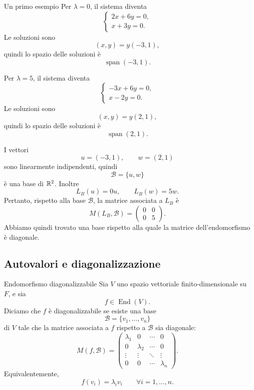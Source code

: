 \documentclass[a4paper]{article}
\begin{document}
\begin{snippetexample}{Un primo esempio}
    Per \(\lambda=0\), il sistema diventa
    \[
        \begin{cases}
            2x+6y=0,\\
            x+3y=0.
        \end{cases}
    \]
    Le soluzioni sono
    \[
        (x,y)=y(-3,1),
    \]
    quindi lo spazio delle soluzioni è
    \[
        \operatorname{span}(-3,1).
    \]

    Per \(\lambda=5\), il sistema diventa
    \[
        \begin{cases}
            -3x+6y=0,\\
            x-2y=0.
        \end{cases}
    \]
    Le soluzioni sono
    \[
        (x,y)=y(2,1),
    \]
    quindi lo spazio delle soluzioni è
    \[
        \operatorname{span}(2,1).
    \]

    I vettori
    \[
        u=(-3,1),
        \qquad
        w=(2,1)
    \]
    sono linearmente indipendenti, quindi
    \[
        \mathcal{B}=\{u,w\}
    \]
    è una base di \(\mathbb{R}^2\). Inoltre
    \[
        L_B(u)=0u,
        \qquad
        L_B(w)=5w.
    \]
    Pertanto, rispetto alla base \(\mathcal{B}\), la matrice associata a \(L_B\) è
    \[
        M(L_B,\mathcal{B})
        =
        \begin{pmatrix}
            0 & 0\\
            0 & 5
        \end{pmatrix}.
    \]
    Abbiamo quindi trovato una base rispetto alla quale la matrice dell'endomorfismo è diagonale.
\end{snippetexample}

\subsection{Autovalori e diagonalizzazione}

\begin{snippetdefinition}{Endomorfismo diagonalizzabile}
    Sia \(V\) uno spazio vettoriale finito-dimensionale su \(F\), e sia
    \[
        f\in\operatorname{End}(V).
    \]
    Diciamo che \(f\) è diagonalizzabile se esiste una base
    \[
        \mathcal{B}=\{v_1,\ldots,v_n\}
    \]
    di \(V\) tale che la matrice associata a \(f\) rispetto a \(\mathcal{B}\) sia diagonale:
    \[
        M(f,\mathcal{B})
        =
        \begin{pmatrix}
            \lambda_1 & 0 & \cdots & 0\\
            0 & \lambda_2 & \cdots & 0\\
            \vdots & \vdots & \ddots & \vdots\\
            0 & 0 & \cdots & \lambda_n
        \end{pmatrix}.
    \]
    Equivalentemente,
    \[
        f(v_i)=\lambda_i v_i
        \qquad
        \forall i=1,\ldots,n.
    \]
\end{snippetdefinition}
\end{document}
